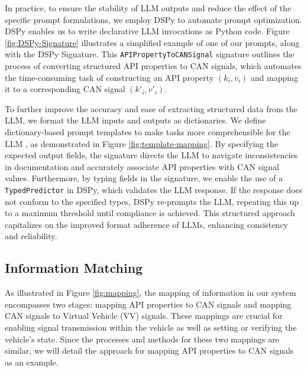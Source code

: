 In practice, to ensure the stability of LLM outputs and reduce the effect of the specific prompt formulations, we employ DSPy \cite{khattab2023dspy} to automate prompt optimization. 
DSPy enables us to write declarative LLM invocations as Python code. Figure \ref{fig:DSPy-Signature} illustrates a simplified example of one of our prompts, along with the DSPy Signature.
This \texttt{APIPropertyToCANSignal} signature outlines the process of converting structured API properties to CAN signals, which automates the time-consuming task of constructing an API property $(k_i, v_i)$ and mapping it to a corresponding CAN signal $(k'_i, v'_i)$.


To further improve the accuracy and ease of extracting structured data from the LLM, we format the LLM inputs and outputs as dictionaries. We define dictionary-based prompt templates to make tasks more comprehensible for the LLM \cite{openai2023structuredoutputs}, as demonstrated in Figure \ref{fig:template-mapping}. By specifying the expected output fields, the signature directs the LLM to navigate inconsistencies in documentation and accurately associate API properties with CAN signal values. Furthermore, by typing fields in the signature, we enable the use of a \texttt{TypedPredictor} in DSPy, which validates the LLM response. If the response does not conform to the specified types, DSPy re-prompts the LLM, repeating this up to a maximum threshold until compliance is achieved. This structured approach capitalizes on the improved format adherence of LLMs, enhancing consistency and reliability.




\subsection{Information Matching}

As illustrated in Figure \ref{fig:mapping}, the mapping of information in our system encompasses two stages: mapping API properties to CAN signals and mapping CAN signals to Virtual Vehicle (VV) signals. These mappings are crucial for enabling signal transmission within the vehicle as well as setting or verifying the vehicle’s state. Since the processes and methods for these two mappings are similar, we will detail the approach for mapping API properties to CAN signals as an example.

